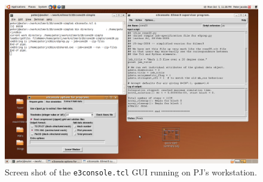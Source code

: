 \begin{figure}
 \includegraphics[width=\textwidth]{figs/e3console-screenshot.png}
 \caption{Screen shot of the \texttt{e3console.tcl} GUI running on PJ's workstation.}
 \label{e3console-screenshot-fig}
\end{figure}

\clearpage
